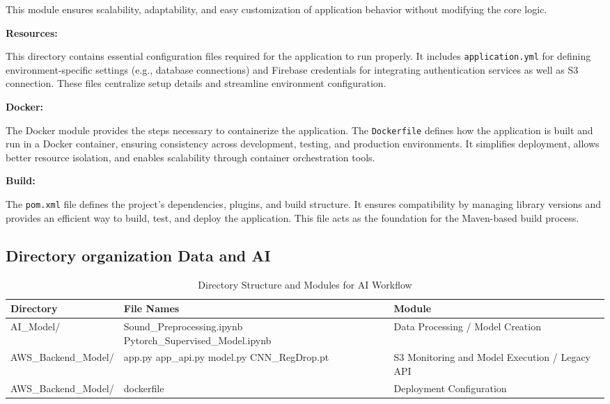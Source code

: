 \documentclass[conference]{IEEEtran}
\begin{document}
This module ensures scalability, adaptability, and easy customization of application behavior without modifying the core logic.


\vspace{0.5cm}

\textbf{Resources:}  

This directory contains essential configuration files required for the application to run properly. It includes \texttt{application.yml} for defining environment-specific settings (e.g., database connections) and Firebase credentials for integrating authentication services as well as S3 connection. These files centralize setup details and streamline environment configuration.

\vspace{0.5cm}

\textbf{Docker:}  

The Docker module provides the steps necessary to containerize the application. The \texttt{Dockerfile} defines how the application is built and run in a Docker container, ensuring consistency across development, testing, and production environments. It simplifies deployment, allows better resource isolation, and enables scalability through container orchestration tools.

\vspace{0.5cm}

\textbf{Build:}  

The \texttt{pom.xml} file defines the project's dependencies, plugins, and build structure. It ensures compatibility by managing library versions and provides an efficient way to build, test, and deploy the application. This file acts as the foundation for the Maven-based build process.

\subsection{Directory organization Data and AI}
\begin{table}[H]
\centering
\renewcommand{\arraystretch}{1.5}
\begin{tabular}{|m{2.6cm}|m{3.5cm}|m{1.6cm}|}
\hline
\textbf{Directory} & \textbf{File Names} & \textbf{Module} \\ \hline

AI\_Model/ & 
Sound\_Preprocessing.ipynb \newline 
Pytorch\_Supervised\_Model.ipynb & 
Data Processing / Model Creation \\ \hline

AWS\_Backend\_Model/ & 
app.py \newline 
app\_api.py \newline 
model.py \newline 
CNN\_RegDrop.pt & 
S3 Monitoring and Model Execution / Legacy API \\ \hline

AWS\_Backend\_Model/ & 
dockerfile & 
Deployment Configuration \\ \hline

\end{tabular}
\caption{Directory Structure and Modules for AI Workflow}
\label{table:workflow_structure}
\end{table}
\end{document}
